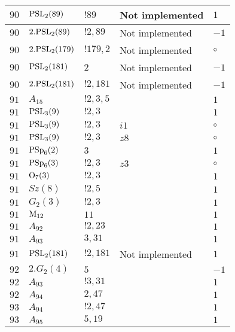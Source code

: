 \documentclass[a4paper, 11pt]{article}
\begin{document}
\begin{longtable}{lllll}
        $ 90 $ & $ {\rm PSL}_{2}(89) $ & $ !89 $ &  Not implemented & $ 1$ \\ \hline
        $ 90 $ & $ 2.{\rm PSL}_{2}(89) $ & $ !2, 89 $ &  Not implemented & $ -1$ \\ \hline
        $ 90 $ & $ 2.{\rm PSL}_{2}(179) $ & $ !179, 2 $ &  Not implemented &  $\circ$ \\ \hline
        $ 90 $ & $ {\rm PSL}_{2}(181) $ & $ 2 $ &  Not implemented & $ -1$ \\ \hline
        $ 90 $ & $ 2.{\rm PSL}_{2}(181) $ & $ !2, 181 $ &  Not implemented & $ -1$ \\ \hline
        $ 91 $ & $ A_{15} $ & $ ! 2,3,5 $ & $ ~ $ & $ 1$ \\ \hline
        $ 91 $ & $ {\rm PSL}_{3}(9) $ & $ ! 2,3 $ & $ ~ $ & $ 1$ \\ \hline
        $ 91 $ & $ {\rm PSL}_{3}(9) $ & $ ! 2,3 $ & $ i1 $ &  $\circ$ \\ \hline
        $ 91 $ & $ {\rm PSL}_{3}(9) $ & $ ! 2,3 $ & $ z8 $ &  $\circ$ \\ \hline
        $ 91 $ & $ {\rm PSp}_{6}(2) $ & $ 3 $ & $ ~ $ & $ 1$ \\ \hline
        $ 91 $ & $ {\rm PSp}_{6}(3) $ & $ ! 2,3 $ & $ z3 $ &  $\circ$ \\ \hline
        $ 91 $ & $ {\rm O}_{7}(3) $ & $ ! 2,3 $ & $ ~ $ & $ 1$ \\ \hline
        $ 91 $ & $ Sz(8) $ & $ ! 2,5 $ & $ ~ $ & $ 1$ \\ \hline
        $ 91 $ & $ G_{2}(3) $ & $ ! 2,3 $ & $ ~ $ & $ 1$ \\ \hline
        $ 91 $ & $ {\rm M}_{12} $ & $ 11 $ & $ ~ $ & $ 1$ \\ \hline
        $ 91 $ & $ A_{92} $ & $ !2, 23 $ & $ ~ $ & $ 1$ \\ \hline
        $ 91 $ & $ A_{93} $ & $ 3, 31 $ & $ ~ $ & $ 1$ \\ \hline
        $ 91 $ & $ {\rm PSL}_{2}(181) $ & $ !2, 181 $ &  Not implemented & $ 1$ \\ \hline
        $ 92 $ & $ 2.G_{2}(4) $ & $ 5 $ & $ ~ $ & $ -1$ \\ \hline
        $ 92 $ & $ A_{93} $ & $ !3, 31 $ & $ ~ $ & $ 1$ \\ \hline
        $ 92 $ & $ A_{94} $ & $ 2, 47 $ & $ ~ $ & $ 1$ \\ \hline
        $ 93 $ & $ A_{94} $ & $ !2, 47 $ & $ ~ $ & $ 1$ \\ \hline
        $ 93 $ & $ A_{95} $ & $ 5, 19 $ & $ ~ $ & $ 1$ \\ \hline

\end{longtable}
\end{document}

